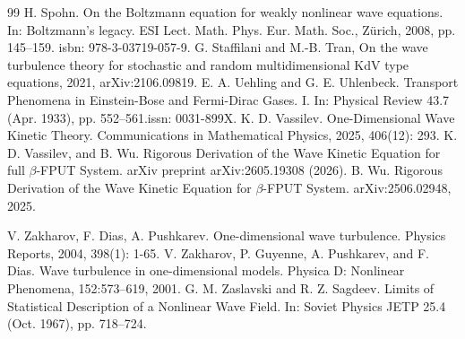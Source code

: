 \documentclass[UTF-8,reqno]{amsart}
\numberwithin{equation}{section}
\theoremstyle{definition}
\begin{document}
\begin{thebibliography}{99}
 H. Spohn. On the Boltzmann equation for weakly nonlinear wave equations. In: Boltzmann’s
 legacy. ESI Lect. Math. Phys. Eur. Math. Soc., Z\"urich, 2008, pp. 145–159. isbn: 978-3-03719-057-9.
   G. Staffilani and M.-B. Tran, On the wave turbulence theory for stochastic and random multidimensional KdV type
 equations, 2021, arXiv:2106.09819.
  E. A. Uehling and G. E. Uhlenbeck. Transport Phenomena in Einstein-Bose and Fermi-Dirac Gases.
 I. In: Physical Review 43.7 (Apr. 1933), pp. 552–561.issn: 0031-899X.
   K. D. Vassilev. One-Dimensional Wave Kinetic Theory. Communications in Mathematical Physics, 2025, 406(12): 293.
K. D. Vassilev, and B. Wu. Rigorous Derivation of the Wave Kinetic Equation for full $\beta $-FPUT System. arXiv preprint arXiv:2605.19308 (2026).
 B. Wu. Rigorous Derivation of the Wave Kinetic Equation for $\beta $-FPUT System. arXiv:2506.02948, 2025.

V. Zakharov, F. Dias, A. Pushkarev. One-dimensional wave turbulence. Physics Reports, 2004, 398(1): 1-65.
V. Zakharov, P. Guyenne, A. Pushkarev, and F. Dias. Wave turbulence in one-dimensional models.
 Physica D: Nonlinear Phenomena, 152:573–619, 2001.
 G. M. Zaslavski and R. Z. Sagdeev. Limits of Statistical Description of a Nonlinear Wave Field. In: Soviet Physics JETP 25.4 (Oct. 1967), pp. 718–724.
\end{thebibliography}

\bigskip 




 
\end{document}
